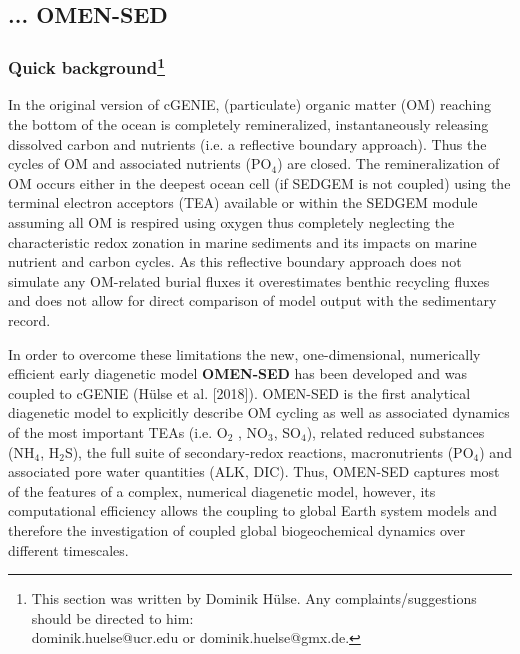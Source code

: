 
\newpage
\subsection{... OMEN-SED}\label{subsec:omen-sed}
\vspace{2mm}

%
\subsubsection*{Quick background\footnote{This section was written by Dominik H\"ulse. Any complaints/suggestions should be directed to him:\\ dominik.huelse@ucr.edu or dominik.huelse@gmx.de.}}

In the original version of cGENIE, (particulate) organic matter (OM) reaching the bottom of the ocean is completely remineralized, instantaneously releasing dissolved carbon and nutrients (i.e. a reflective boundary approach).
Thus the cycles of OM and associated nutrients (PO$_4$) are closed. The remineralization of OM occurs either in the deepest ocean cell (if SEDGEM is not coupled) using the terminal electron acceptors (TEA) available or within the SEDGEM
module assuming all OM is respired using oxygen thus completely neglecting the characteristic redox zonation in marine sediments and its impacts on marine nutrient and carbon cycles.
As this reflective boundary approach does not simulate any OM-related burial fluxes it overestimates benthic recycling fluxes and does not allow for direct comparison of model output with the sedimentary record.

In order to overcome these limitations the new, one-dimensional, numerically efficient early diagenetic model \textbf{OMEN-SED} has been developed and was coupled to cGENIE (H\"ulse et al. [2018]).
OMEN-SED is the first analytical diagenetic model to explicitly describe OM cycling as well as associated dynamics of the most important TEAs (i.e. O$_2$ , NO$_3$, SO$_4$), related reduced substances (NH$_4$, H$_2$S), the full suite of
secondary-redox reactions, macronutrients (PO$_4$) and associated pore water quantities (ALK, DIC). Thus, OMEN-SED captures most of the features of a complex, numerical diagenetic model, however, its computational efficiency allows the
coupling to global Earth system models and therefore the investigation of coupled global biogeochemical dynamics over different timescales.

